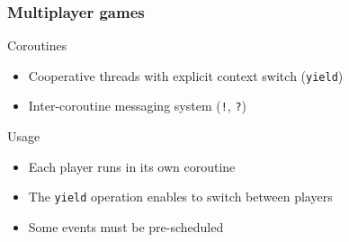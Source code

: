 \documentclass{beamer}
\newcommand{\<}[1]{\`#1}
\begin{document}
\begin{frame}
  \frametitle{Multiplayer games}

  \begin{block}{Coroutines}
    \begin{itemize}
    \item Cooperative threads with explicit context switch
      (\texttt{yield})
    \item Inter-coroutine messaging system (\texttt{!}, \texttt{?})
    \end{itemize}
  \end{block}

  \begin{block}{Usage}
    \begin{itemize}
    \item Each player runs in its own coroutine
    \item The \texttt{yield} operation enables to switch between players
    \item Some events must be pre-scheduled 
    \end{itemize}
  \end{block}
\end{frame}
\end{document}
